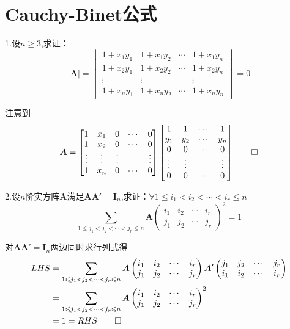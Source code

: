\section{Cauchy-Binet公式}
1.设$n\geqslant 3$,求证：
\[
\left|\bm{A}\right|=\begin{vmatrix}
    1+x_1y_1&1+x_1y_2&\cdots&1+x_1y_n\\
    1+x_2y_1&1+x_2y_2&\cdots&1+x_2y_n\\
    \vdots&\vdots&&\vdots\\
    1+x_ny_1&1+x_ny_2&\cdots&1+x_ny_n
\end{vmatrix}=0
\]
\begin{Proof}
注意到
\[
\bm{A}=\begin{bmatrix}
    1&x_1&0&\cdots&0\\
    1&x_2&0&\cdots&0\\
    \vdots&\vdots&\vdots&&\vdots\\
    1&x_n&0&\cdots&0 
\end{bmatrix}
\begin{bmatrix}
    1&1&\cdots&1\\
    y_1&y_2&\cdots&y_n\\
    0&0&\cdots&0\\
    \vdots&\vdots&&\vdots\\
    0&0&\cdots&0
\end{bmatrix}\qedhere
\]
\end{Proof}
2.设$n$阶实方阵$\bm{A}$满足$\bm{AA}'=\bm{I}_n$,求证：$\forall 1\leqslant i_1<i_2<\cdots<i_r\leqslant n$
\[
\sum_{
    1\leqslant j_1<j_2<\cdots<j_r\leqslant n
}\bm{A}\begin{pmatrix}
    i_1&i_2&\cdots&i_r\\
    j_1&j_2&\cdots&j_r
\end{pmatrix}^2=1
\]
\begin{Proof}
对$\bm{AA}'=\bm{I}_n$两边同时求行列式得
\begin{align*}
     LHS &=\sum_{
        1\leqslant j_1<j_2<\cdots<j_r\leqslant n
    }\bm{A}\begin{pmatrix}
        i_1&i_2&\cdots&i_r\\
        j_1&j_2&\cdots&j_r
    \end{pmatrix}
    \bm{A}'\begin{pmatrix}
        j_1&j_2&\cdots&j_r\\
        i_1&i_2&\cdots&i_r
    \end{pmatrix}\\
    &=\sum_{
        1\leqslant j_1<j_2<\cdots<j_r\leqslant n
    }\bm{A}\begin{pmatrix}
        i_1&i_2&\cdots&i_r\\
        j_1&j_2&\cdots&j_r
    \end{pmatrix}^2\\
    &=1=RHS\qedhere
\end{align*}
\end{Proof}
